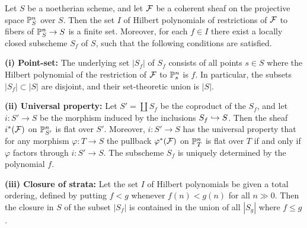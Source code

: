 \begin{theorem}\label{nhq-flattening-stratification}
Let $S$ be a noetherian scheme, and let
$\mathcal{F}$ be a coherent sheaf on the projective space $\mathbb{P}^n_S$
over $S$. Then the set $I$ of Hilbert polynomials of
restrictions of $\mathcal{F}$ to fibers of $\mathbb{P}^n_S\to S$
is a finite set. Moreover, for each $f\in I$ there exist
a locally closed subscheme $S_f$ of $S$,
such that the following conditions are satisfied.

\textbf{(i) Point-set: } The underlying set $|S_f|$ of $S_f$ consists of
all points $s\in S$ where the Hilbert polynomial of the
restriction of $\mathcal{F}$ to $\mathbb{P}^n_s$ is $f$. In particular,
the subsets $|S_f|\subset |S|$ are disjoint,
and their set-theoretic union is $|S|$.

\textbf{(ii) Universal property: }
Let $S'=\coprod S_f$ be the coproduct of the $S_f$, and let
$i:S'\to S$ be the morphism induced by the inclusions
$S_f\hookrightarrow S$. Then the sheaf $i^*(\mathcal{F})$ on $\mathbb{P}^n_{S'}$
is flat over $S'$. Moreover, $i:S'\to S$ has the universal property that
for any morphism $\varphi :T\to S$ the pullback $\varphi^*(\mathcal{F})$ on
$\mathbb{P}^n_T$ is flat over $T$ if and only if $\varphi$ factors through
$i:S'\to S$.  The subscheme $S_f$ is
uniquely determined by the polynomial $f$.

\textbf{(iii) Closure of strata: }
Let the set $I$ of Hilbert polynomials be given a total
ordering, defined by putting $f<g$ whenever $f(n) < g(n)$ for all
$n \gg  0$. Then the closure in $S$ of the subset $|S_f|$
is contained in the union of all $|S_g|$ where $f\le g$.
\end{theorem}


